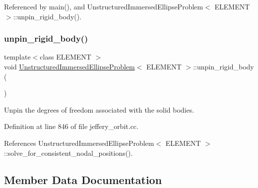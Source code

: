 Referenced by main(), and Unstructured\+Immersed\+Ellipse\+Problem$<$ E\+L\+E\+M\+E\+N\+T $>$\+::unpin\+\_\+rigid\+\_\+body().

\mbox{\label{classUnstructuredImmersedEllipseProblem_a4f8c7e7e4d626084f6515a152b165567}} 
\subsubsection{\texorpdfstring{unpin\+\_\+rigid\+\_\+body()}{unpin\_rigid\_body()}}
{\footnotesize\ttfamily template$<$class E\+L\+E\+M\+E\+NT $>$ \\
void \hyperlink{classUnstructuredImmersedEllipseProblem}{Unstructured\+Immersed\+Ellipse\+Problem}$<$ E\+L\+E\+M\+E\+NT $>$\+::unpin\+\_\+rigid\+\_\+body (\begin{DoxyParamCaption}{ }\end{DoxyParamCaption})\hspace{0.3cm}{\ttfamily [private]}}



Unpin the degrees of freedom associated with the solid bodies. 



Definition at line 846 of file jeffery\+\_\+orbit.\+cc.



References Unstructured\+Immersed\+Ellipse\+Problem$<$ E\+L\+E\+M\+E\+N\+T $>$\+::solve\+\_\+for\+\_\+consistent\+\_\+nodal\+\_\+positions().



\subsection{Member Data Documentation}
\mbox{\label{classUnstructuredImmersedEllipseProblem_a3dc1ec2e066466a6f228864b873d95fa}} 

